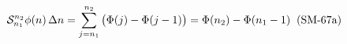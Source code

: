 \documentclass[preview]{standalone}
\begin{document}
\begin{align*}
\special{dvisvgm:raw <g id='unique000'>}\mathcal{S}_{n_1}^{n_2}\phi(n)\,\Delta n = \sum_{j=n_1}^{n_2}\big(\Phi(j)-\Phi(j-1)\big) = \Phi(n_2) - \Phi(n_1-1)\;\;(\text{SM-67a})\special{dvisvgm:raw </g>}
\end{align*}
\end{document}
